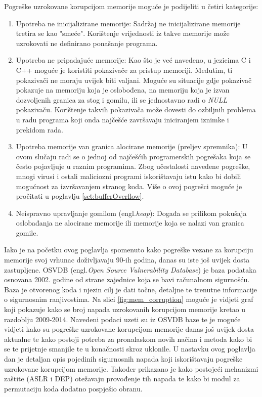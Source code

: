 \documentclass[times, utf8, diplomski, numeric]{fer}
\begin{document}
Pogreške uzrokovane korupcijom memorije moguće je podijeliti u
četiri kategorije:

\begin{enumerate}

\item Upotreba ne inicijalizirane memorije: Sadržaj ne
inicijalizirane memorije tretira se kao "smeće". Korištenje
vrijednosti iz takve memorije može uzrokovati ne definirano
ponašanje programa.

\item Upotreba ne pripadajuće memorije: Kao što je već navedeno,
u jezicima C i C++ moguće je koristiti pokazivače za pristup
memoriji. Međutim, ti pokazivači ne moraju uvijek biti valjani.
Moguće su situacije gdje pokazivač pokazuje na memoriju koja je
oslobođena, na memoriju koja je izvan dozvoljenih granica za stog
i gomilu, ili se jednostavno radi o \emph{NULL} pokazivaču.
Korištenje takvih pokazivača može dovesti do ozbiljnih problema u
radu programa koji onda najčešće završavaju iniciranjem iznimke i
prekidom rada.

\item Upotreba memorije van granica alocirane memorije (preljev
spremnika): U ovom slučaju radi se o jednoj od najčešćih
programerskih pogrešaka koja se često pojavljuje u raznim
programima. Zbog učestalosti navedene pogreške, mnogi virusi i
ostali maliciozni programi iskorištavaju istu kako bi dobili
mogućnost za izvršavanjem stranog koda. Više o ovoj pogrešci
moguće je pročitati u poglavlju \ref{sct:bufferOverflow}.

\item Neispravno upravljanje gomilom (engl.\emph{heap}): Događa
se prilikom pokušaja oslobađanja ne alocirane memorije ili
memorije koja se nalazi van granica gomile. 

\end{enumerate}

Iako je na početku ovog poglavlja spomenuto kako pogreške vezane
za korupciju memorije svoj vrhunac doživljavaju 90-ih godina,
danas su iste još uvijek dosta zastupljene. OSVDB
(engl.\emph{Open Source Vulnerability Database}) je baza podataka
osnovana 2002. godine od strane zajednice koja se bavi računalnom
sigurnošću. Baza je otvorenog koda i njezin cilj je dati točne,
detaljne te trenutne informacije o sigurnosnim ranjivostima. Na
slici \ref{fig:mem_corruption} moguće je vidjeti graf koji
pokazuje kako se broj napada uzrokovanih korupcijom memorije
kretao u razdoblju 2009-2014. Navedeni podaci uzeti su iz OSVDB
baze te je moguće vidjeti kako su pogreške uzrokovane korupcijom
memorije danas još uvijek dosta aktualne te kako postoji potreba
za pronalaskom novih načina i metoda kako bi se te prijetnje
smanjile te u konačnosti skroz uklonile. U nastavku ovog
poglavlja dan je detaljan opis pojedinih sigurnosnih napada koji
iskorištavaju pogreške uzrokovane korupcijom memorije. Također
prikazano je kako postojeći mehanizmi zaštite (ASLR i DEP)
otežavaju provođenje tih napada te kako bi modul za permutaciju
koda dodatno pospješio obranu. 
\end{document}

